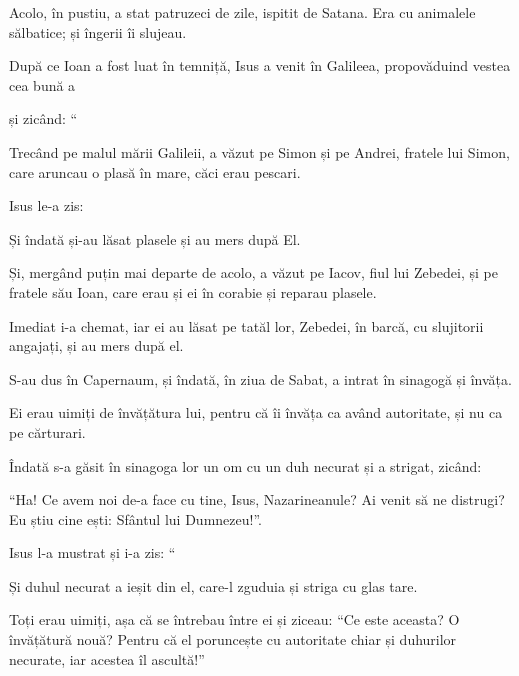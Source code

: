 {Acolo, în pustiu, a stat patruzeci de zile, ispitit de Satana. Era cu animalele sălbatice; și îngerii îi slujeau.


\par }{\PP {}După ce Ioan a fost luat în temniță, Isus a venit în Galileea, propovăduind vestea cea bună a
{}

și zicând: “{}


\par }{\PP {}Trecând pe malul mării Galileii, a văzut pe Simon și pe Andrei, fratele lui Simon, care aruncau o plasă în mare, căci erau pescari.

Isus le-a zis:
{}


\par }{\PP {}Și îndată și-au lăsat plasele și au mers după El.


\par }{\PP {}Și, mergând puțin mai departe de acolo, a văzut pe Iacov, fiul lui Zebedei, și pe fratele său Ioan, care erau și ei în corabie și reparau plasele.

Imediat i-a chemat, iar ei au lăsat pe tatăl lor, Zebedei, în barcă, cu slujitorii angajați, și au mers după el.


\par }{\PP {}S-au dus în Capernaum, și îndată, în ziua de Sabat, a intrat în sinagogă și învăța.

Ei erau uimiți de învățătura lui, pentru că îi învăța ca având autoritate, și nu ca pe cărturari.

Îndată s-a găsit în sinagoga lor un om cu un duh necurat și a strigat, zicând:

“Ha! Ce avem noi de-a face cu tine, Isus, Nazarineanule? Ai venit să ne distrugi? Eu știu cine ești: Sfântul lui Dumnezeu!”.


\par }{\PP {}Isus l-a mustrat și i-a zis: “{}


\par }{\PP {}Și duhul necurat a ieșit din el, care-l zguduia și striga cu glas tare.

Toți erau uimiți, așa că se întrebau între ei și ziceau: “Ce este aceasta? O învățătură nouă? Pentru că el poruncește cu autoritate chiar și duhurilor necurate, iar acestea îl ascultă!”

}

